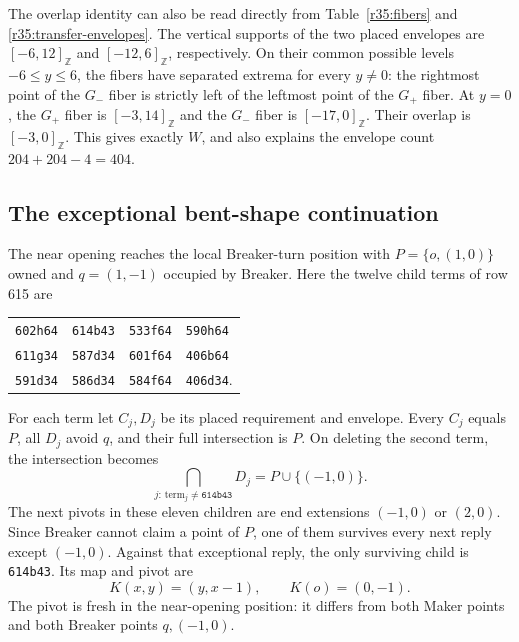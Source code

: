 The overlap identity can also be read directly from
Table~\ref{r35:fibers} and \eqref{r35:transfer-envelopes}.  The vertical
supports of the two placed envelopes are \([-6,12]_{\mathbb Z}\) and
\([-12,6]_{\mathbb Z}\), respectively.  On their common possible levels
\(-6\le y\le6\), the fibers have separated extrema for every
\(y\ne0\): the rightmost point of the \(G_-\) fiber is strictly left
of the leftmost point of the \(G_+\) fiber.  At \(y=0\), the
\(G_+\) fiber is \([-3,14]_{\mathbb Z}\) and the \(G_-\) fiber is
\([-17,0]_{\mathbb Z}\).  Their overlap is \([-3,0]_{\mathbb Z}\).
This gives exactly \(W\), and also explains
the envelope count \(204+204-4=404\).

\subsection{The exceptional bent-shape continuation}
\label{r35:exception}

The near opening reaches the local Breaker-turn position with
\(P=\{o,(1,0)\}\) owned and \(q=(1,-1)\) occupied by Breaker.
Here the twelve child terms of row 615 are
\begin{center}
\begin{tabular}{llll}
\texttt{602h64}&\texttt{614b43}&\texttt{533f64}&\texttt{590h64}\\
\texttt{611g34}&\texttt{587d34}&\texttt{601f64}&\texttt{406b64}\\
\texttt{591d34}&\texttt{586d34}&\texttt{584f64}&\texttt{406d34}.
\end{tabular}
\end{center}
For each term let \(C_j,D_j\) be its placed requirement and envelope.
Every \(C_j\) equals \(P\), all \(D_j\) avoid \(q\), and their full
intersection is \(P\).  On deleting the second term, the intersection
becomes
\begin{equation}\label{r35:exception-intersection}
 \bigcap_{j:\,\text{term}_j\ne\texttt{614b43}}D_j
       =P\cup\{(-1,0)\}.
\end{equation}
The next pivots in these eleven children are end extensions
\((-1,0)\) or \((2,0)\).  Since Breaker cannot claim a point of \(P\),
one of them survives every next reply except \((-1,0)\).  Against that
exceptional reply, the only surviving child is \texttt{614b43}.
Its map and pivot are
\[
 K(x,y)=(y,x-1),\qquad K(o)=(0,-1).
\]
The pivot is fresh in the near-opening position: it differs from both
Maker points and both Breaker points \(q,(-1,0)\).

